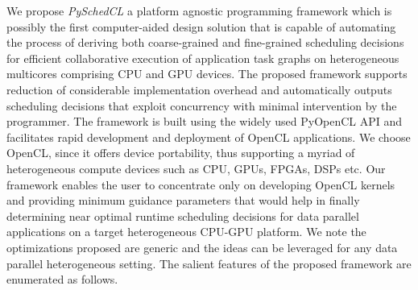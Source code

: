     We propose {\em PySchedCL} a platform agnostic programming framework which is possibly the first computer-aided design solution that is capable of automating the process of deriving both coarse-grained and fine-grained scheduling decisions for efficient collaborative execution of application task graphs on heterogeneous multicores comprising CPU and GPU devices. The proposed framework supports reduction of considerable implementation overhead and automatically outputs scheduling decisions that exploit concurrency with minimal intervention by the programmer. The framework is built using the widely used PyOpenCL API \cite{pyopencl} and facilitates rapid development and deployment of OpenCL applications. We choose OpenCL, since it offers device portability, thus supporting a myriad of heterogeneous compute devices such as CPU, GPUs, FPGAs, DSPs etc. Our framework enables the user to concentrate only on developing OpenCL kernels and providing minimum guidance parameters that would help in finally determining near optimal runtime scheduling decisions for data parallel applications on a target heterogeneous CPU-GPU platform. We note the optimizations proposed are generic and the ideas can be leveraged for any data parallel heterogeneous setting. The salient features of the proposed framework are enumerated as follows.

